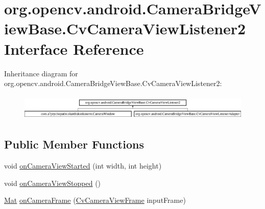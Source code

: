 \hypertarget{interfaceorg_1_1opencv_1_1android_1_1_camera_bridge_view_base_1_1_cv_camera_view_listener2}{}\section{org.\+opencv.\+android.\+Camera\+Bridge\+View\+Base.\+Cv\+Camera\+View\+Listener2 Interface Reference}
\label{interfaceorg_1_1opencv_1_1android_1_1_camera_bridge_view_base_1_1_cv_camera_view_listener2}
Inheritance diagram for org.\+opencv.\+android.\+Camera\+Bridge\+View\+Base.\+Cv\+Camera\+View\+Listener2\+:\begin{figure}[H]
\begin{center}
\leavevmode
\includegraphics[height=1.230769cm]{interfaceorg_1_1opencv_1_1android_1_1_camera_bridge_view_base_1_1_cv_camera_view_listener2}
\end{center}
\end{figure}
\subsection*{Public Member Functions}
\begin{DoxyCompactItemize}
\item 
void \mbox{\hyperlink{interfaceorg_1_1opencv_1_1android_1_1_camera_bridge_view_base_1_1_cv_camera_view_listener2_a8229eca0048f11f06e2cd798c10a1b4d}{on\+Camera\+View\+Started}} (int width, int height)
\item 
void \mbox{\hyperlink{interfaceorg_1_1opencv_1_1android_1_1_camera_bridge_view_base_1_1_cv_camera_view_listener2_a0c02fc823ee690e08e6076611cff430b}{on\+Camera\+View\+Stopped}} ()
\item 
\mbox{\hyperlink{classorg_1_1opencv_1_1core_1_1_mat}{Mat}} \mbox{\hyperlink{interfaceorg_1_1opencv_1_1android_1_1_camera_bridge_view_base_1_1_cv_camera_view_listener2_aa8cf69267ec5580344728dbadbf6ae0f}{on\+Camera\+Frame}} (\mbox{\hyperlink{interfaceorg_1_1opencv_1_1android_1_1_camera_bridge_view_base_1_1_cv_camera_view_frame}{Cv\+Camera\+View\+Frame}} input\+Frame)
\end{DoxyCompactItemize}



